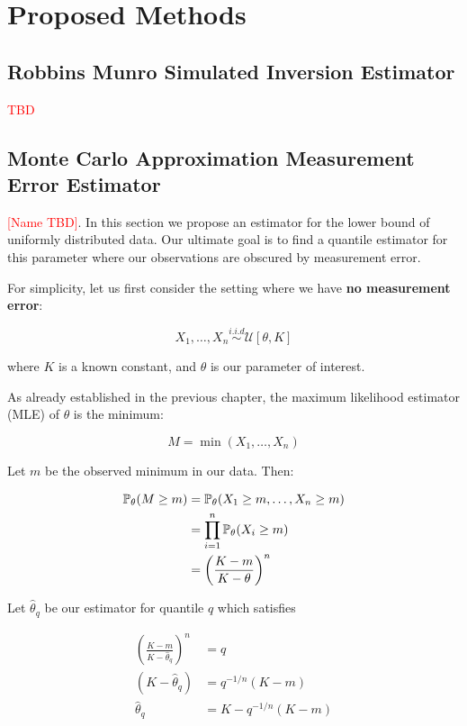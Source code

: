 \chapter{Proposed Methods}\label{proposed-methods}

\section{Robbins Munro Simulated Inversion Estimator}

\textcolor{red}{TBD}

\section{Monte Carlo Approximation Measurement Error Estimator}

\textcolor{red}{[Name TBD]}. In this section we propose an estimator for the lower bound of uniformly distributed data. Our ultimate goal is to find a quantile estimator for this parameter where our observations are obscured by measurement error.

For simplicity, let us first consider the setting where we have \textbf{no measurement error}:

\[
X_1, \dots, X_n \overset{i.i.d}{\sim} \mathcal{U}[\theta, K]
\]

where $K$ is a known constant, and $\theta$ is our parameter of interest.

As already established in the previous chapter, the maximum likelihood estimator (MLE) of $\theta$ is the minimum:

\[
    M = \min{(X_1, \dots, X_n)}
\]

Let $m$ be the observed minimum in our data. Then:

\begin{align*}
    \mathbb{P}_\theta (M \geq m) &= \mathbb{P}_\theta(X_1 \geq m, \dots, X_n \geq m) \\
        &= \prod_{i=1}^n \mathbb{P}_\theta (X_i \geq m) \\
        &= \left( \frac{K - m}{K - \theta} \right)^n
\end{align*}

Let $\hat{\theta}_q$ be our estimator for quantile $q$ which satisfies

\begin{align*}
    \left( \frac{K - m}{K - \hat{\theta}_q} \right)^n &= q \\
    (K - \hat{\theta}_q) &= q^{-1/n} (K - m) \\
    \hat{\theta}_q &= K - q^{-1/n} (K-m)
\end{align*}

